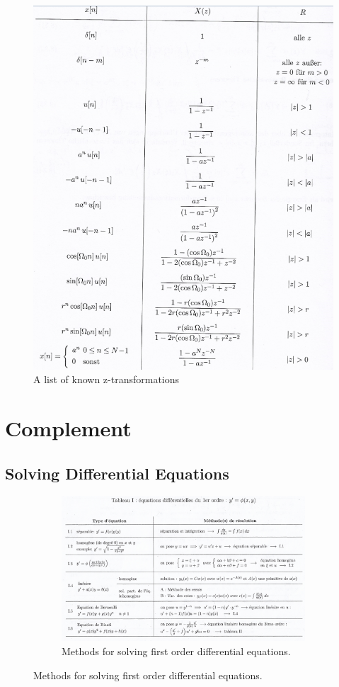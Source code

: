 \documentclass[10pt,a4paper]{article}
\begin{document}
\begin{figure}[H]
\centering
\includegraphics[scale=0.9]{4ZIdentities.PNG}
\caption{A list of known z-transformations}
\end{figure}

\section{Complement}
\subsection{Solving Differential Equations}
\begin{figure}
\begin{figure}[H]
\centering
\includegraphics[scale=0.7]{EquaDiff_1.PNG}
\caption{Methods for solving first order differential equations.}
\end{figure}
\end{figure}
\end{document}
